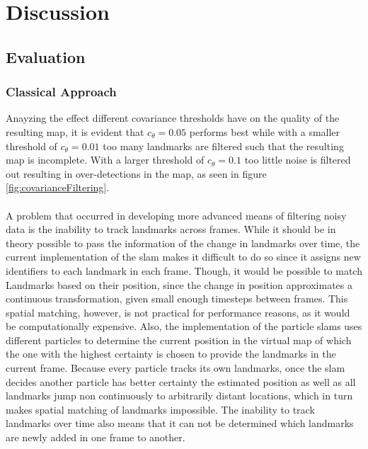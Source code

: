 \graphicspath{{Chapter/Figs/evaluation/}}
\chapter{Discussion}

\section{Evaluation}
\subsection{Classical Approach}
Anayzing the effect different covariance thresholds have on the quality of the resulting map, it is evident that $c_\theta=0.05$ performs best while with a smaller threshold of $c_\theta=0.01$ too many landmarks are filtered such that the resulting map is incomplete. With a larger threshold of $c_\theta=0.1$ too little noise is filtered out resulting in over-detections in the map, as seen in figure \ref{fig:covarianceFiltering}.\\
\\
A problem that occurred in developing more advanced means of filtering noisy data is the inability to track landmarks across frames. While it should be in theory possible to pass the information of the change in landmarks over time, the current implementation of the \ac{slam} makes it difficult to do so since it assigns new identifiers to each landmark in each frame. Though, it would be possible to match Landmarks based on their position, since the change in position approximates a continuous transformation, given small enough timesteps between frames. This spatial matching, however, is not practical for performance reasons, as it would be computationally expensive. Also, the implementation of the particle \ac{slam}s uses different particles to determine the current position in the virtual map of which the one with the highest certainty is chosen to provide the landmarks in the current frame. Because every particle tracks its own landmarks, once the \ac{slam} decides another particle has better certainty the estimated position as well as all landmarks jump non continuously to arbitrarily distant locations, which in turn makes spatial matching of landmarks impossible. The inability to track landmarks over time also means that it can not be determined which landmarks are newly added in one frame to another.
